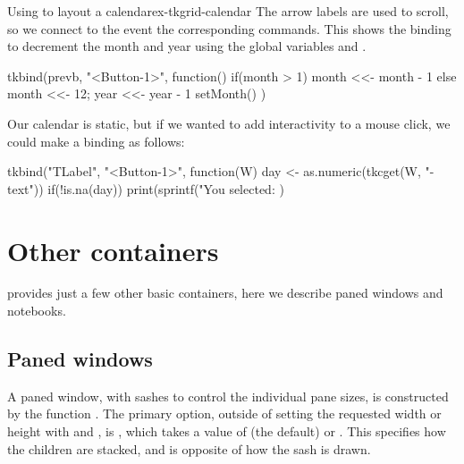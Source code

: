 \begin{example}{Using  to layout a calendar}{ex-tkgrid-calendar}
The arrow labels are used to scroll, so we connect to the
 event the corresponding commands. This shows the
binding to decrement the month and year using the global variables
 and .
\begin{Schunk}
\begin{Sinput}
 tkbind(prevb, "<Button-1>", function() {
   if(month > 1) {
     month <<- month - 1
   } else {
     month <<- 12; year <<- year - 1
   }
   setMonth()
 })
\end{Sinput}
\end{Schunk}


Our calendar is static, but if we wanted to add interactivity to a
mouse click, we could make a binding as follows:
  
\begin{Schunk}
\begin{Sinput}
 tkbind("TLabel", "<Button-1>", function(W) {
   day <- as.numeric(tkcget(W, "-text"))
   if(!is.na(day))
     print(sprintf("You selected: %
 })
\end{Sinput}
\end{Schunk}


\end{example}

\section{Other containers}
\label{sec:tcltk:other-containers}
\TK\/ provides just a few other basic containers, here we describe paned windows and notebooks.

\subsection{Paned windows}
\label{sec:tcltk:paned-windows}

A paned window, with sashes to control the individual pane sizes, is constructed by the function
. The primary option, outside of setting
the requested width or height with  and
, is ,
which takes a value of  (the default) or
. This specifies how the children are stacked, and
is opposite of how the sash is drawn.

